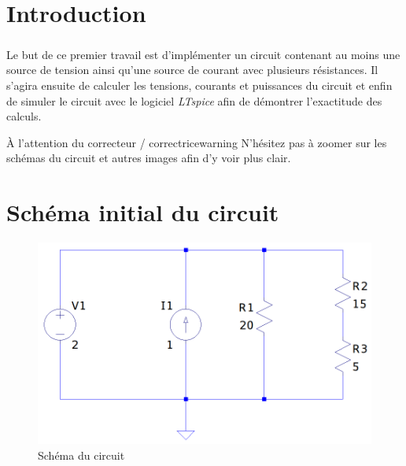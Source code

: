 \section{Introduction}

    \subparagraph{}Le but de ce {\color{info}premier travail} est d'implémenter un circuit contenant au moins une source de tension ainsi qu'une source de courant avec 
    plusieurs résistances. Il s'agira ensuite de calculer les tensions, courants et puissances du circuit et enfin de simuler le circuit avec le logiciel \textit{LTspice}
    afin de démontrer l'exactitude des calculs.\\[1.5cm]
    
    \begin{titletbox}{À l'attention du correcteur / correctrice}{warning}
        N'hésitez pas à zoomer sur les schémas du circuit et autres images afin d'y voir plus clair.
    \end{titletbox}

\section{Schéma initial du circuit}

    \begin{figure}[H]
        \centering
        \includegraphics[scale=0.7]{../pictures/circuit.png} %
        \caption{Schéma du circuit}
    \end{figure}

